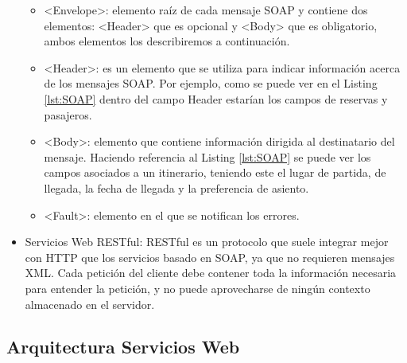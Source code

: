 \begin{itemize}
	\begin{itemize}
		\item <Envelope>: elemento raíz de cada mensaje SOAP y contiene dos elementos: <Header> que es opcional y <Body> que es obligatorio, ambos elementos los describiremos a continuación.
		\item <Header>: es un elemento que se utiliza para indicar información acerca de los mensajes SOAP. Por ejemplo, como se puede ver en el Listing \ref{lst:SOAP} dentro del campo Header estarían los campos de reservas y pasajeros.
		\item <Body>: elemento que contiene información dirigida al destinatario del mensaje. Haciendo referencia al Listing \ref{lst:SOAP} se puede ver los campos asociados a un itinerario, teniendo este el lugar de partida, de llegada, la fecha de llegada y la preferencia de asiento.
		\item <Fault>: elemento en el que se notifican los errores.
			
	\end{itemize}

	\item Servicios Web RESTful: RESTful es un protocolo que suele integrar mejor con HTTP que los servicios basado en SOAP, ya que no requieren mensajes XML. Cada petición del cliente debe contener toda la información necesaria para entender la petición, y no puede aprovecharse de ningún contexto almacenado en el servidor.
	
\end{itemize}



\subsection{Arquitectura Servicios Web}
\label{cap:subsec:arquitecturaserviciosweb}

